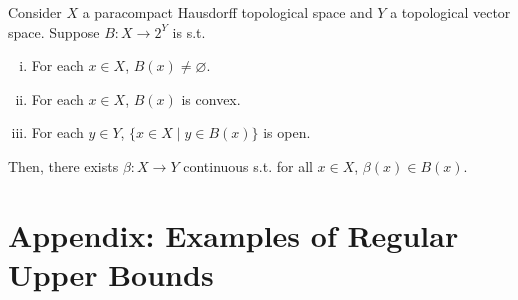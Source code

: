 \begin{samepage}
\begin{theorem} 
\label{thm:selection}

Consider $X$ a paracompact Hausdorff topological space and $Y$ a topological vector space. Suppose $B: X \rightarrow 2^Y$ is s.t.

\begin{enumerate}[i.]

\item For each $x \in X$, $B\left(x\right) \ne \varnothing$.
\item For each $x \in X$, $B\left(x\right)$ is convex.
\item For each $y \in Y$, $\{x \in X \mid y \in B\left(x\right)\}$ is open.

\end{enumerate}

Then, there exists $\beta: X \rightarrow Y$ continuous s.t. for all $x \in X$, $\beta\left(x\right) \in B\left(x\right)$.

\end{theorem}
\end{samepage}

\section{Appendix: Examples of Regular Upper Bounds}
\label{sec:examples}

